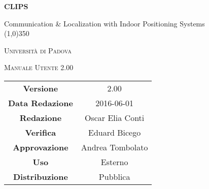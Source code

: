 \documentclass[a4paper,12pt]{article}
\author{Eduard Bicego}
\date{01/05/2016}
\begin{document}
\begin{titlepage}
	\centering
	{\huge\bfseries CLIPS\par}
	Communication \& Localization with Indoor Positioning Systems \\
	\line(1,0){350} \\
	{\scshape\LARGE Università di Padova \par}
	\vspace{1cm}
	{\scshape\Large Manuale Utente 2.00 \par}
	\logo
	\newpage
	\begin{tabular}{c|c}
		{\hfill \textbf{Versione}} 			& 2.00					\\
		{\hfill\textbf{Data Redazione}} 		& 2016-06-01  		\\
		{\hfill\textbf{Redazione}} 			& Oscar Elia Conti		\\
		{\hfill\textbf{Verifica}} 				&  Eduard Bicego	\\
		{\hfill\textbf{Approvazione}} 		& Andrea Tombolato		\\
		{\hfill\textbf{Uso}} 					& Esterno			\\
		{\hfill\textbf{Distribuzione}} 			& Pubblica 			\\
	\end{tabular}
\end{titlepage}


	
	\newpage
	\pagestyle{myfront}
	
		\newpage
			
		\newpage
			\tableofcontents
		\newpage
			\listoffigures
	\label{LastFrontPage}

	\newpage
		\pagestyle{mymain}
	\newpage
		
	\newpage
		
	\newpage
		
	\newpage
		
	\newpage
		
	\newpage
		
	
	
	\newpage
		\printglossary

		
	\label{LastPage}
\end{document}
